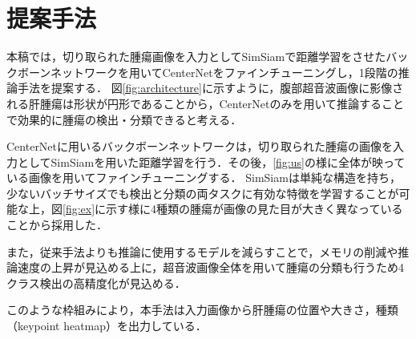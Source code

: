 \documentclass[a4j,8pt,twocolumn]{extarticle}
\begin{document}
    \section{提案手法}
        \label{sec:propose}
        本稿では，切り取られた腫瘍画像を入力としてSimSiam\cite{chen2021exploring}で距離学習をさせたバックボーンネットワークを用いてCenterNet\cite{zhou2019objects}をファインチューニングし，1段階の推論手法を提案する．
        図\ref{fig:architecture}に示すように，腹部超音波画像に影像される肝腫瘍は形状が円形であることから，CenterNetのみを用いて推論することで効果的に腫瘍の検出・分類できると考える．

        CenterNetに用いるバックボーンネットワークは，切り取られた腫瘍の画像を入力としてSimSiamを用いた距離学習を行う．その後，\ref{fig:us}の様に全体が映っている画像を用いてファインチューニングする．
        SimSiamは単純な構造を持ち，少ないバッチサイズでも検出と分類の両タスクに有効な特徴を学習することが可能な上，図\ref{fig:ex}に示す様に4種類の腫瘍が画像の見た目が大きく異なっていることから採用した．

        また，従来手法よりも推論に使用するモデルを減らすことで，メモリの削減や推論速度の上昇が見込める上に，超音波画像全体を用いて腫瘍の分類も行うため4クラス検出の高精度化が見込める．

        このような枠組みにより，本手法は入力画像から肝腫瘍の位置や大きさ，種類（keypoint heatmap）を出力している．
\end{document}
